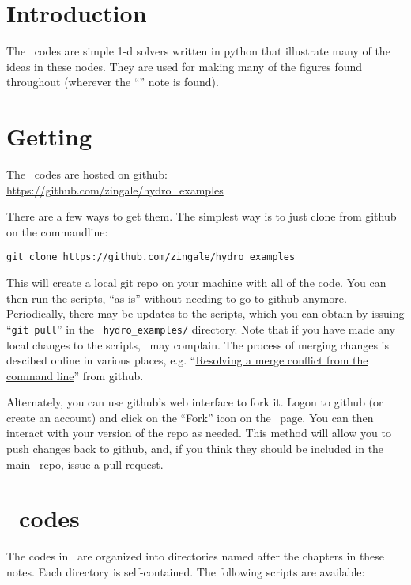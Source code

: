 \label{app:hydroex}

\section{Introduction}

The \hydroex\ codes are simple 1-d solvers written in python that illustrate many of the
ideas in these nodes.  They are used for making many of the figures found throughout
(wherever the ``\hydroexdoit{}'' note is found).

\section{Getting \hydroex}

The \hydroex\ codes are hosted on github:\\
\url{https://github.com/zingale/hydro_examples}

There are a few ways to get them.  The simplest way is to just clone
from github on the commandline:

\begin{verbatim}
git clone https://github.com/zingale/hydro_examples
\end{verbatim}

This will create a local git repo on your machine with all of the
code.  You can then run the scripts, ``as is'' without needing to go
to github anymore.  Periodically, there may be updates to the scripts,
which you can obtain by issuing ``{\tt git pull}'' in the {\tt
hydro\_examples/} directory.  Note that if you have made any local
changes to the scripts, \git\ may complain.  The process of merging
changes is descibed online in various places,
e.g. ``\href{https://help.github.com/articles/resolving-a-merge-conflict-from-the-command-line}{Resolving
a merge conflict from the command line}'' from github.

Alternately, you can use github's web interface to fork it.  Logon to
github (or create an account) and click on the ``Fork'' icon on the
\hydroex\ page.  You can then interact with your version of the repo
as needed.  This method will allow you to push changes back to github,
and, if you think they should be included in the main \hydroex\ repo,
issue a pull-request.

\section{\hydroex\ codes}

The codes in \hydroex\ are organized into directories named after the
chapters in these notes.  Each directory is self-contained.  The
following scripts are available:

